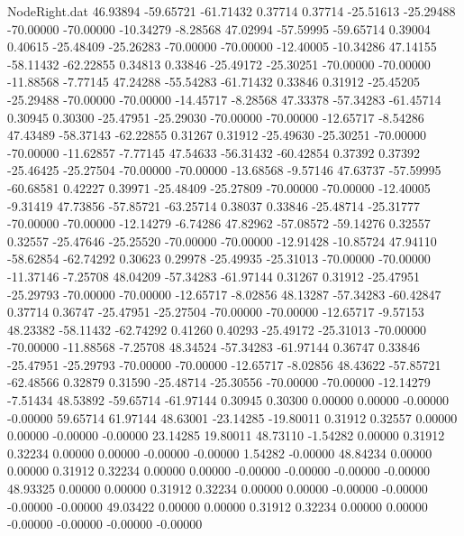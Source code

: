 \begin{filecontents}{NodeRight.dat}
  46.93894  -59.65721  -61.71432     0.37714    0.37714  -25.51613  -25.29488  -70.00000  -70.00000  -10.34279   -8.28568
  47.02994  -57.59995  -59.65714     0.39004    0.40615  -25.48409  -25.26283  -70.00000  -70.00000  -12.40005  -10.34286
  47.14155  -58.11432  -62.22855     0.34813    0.33846  -25.49172  -25.30251  -70.00000  -70.00000  -11.88568   -7.77145
  47.24288  -55.54283  -61.71432     0.33846    0.31912  -25.45205  -25.29488  -70.00000  -70.00000  -14.45717   -8.28568
  47.33378  -57.34283  -61.45714     0.30945    0.30300  -25.47951  -25.29030  -70.00000  -70.00000  -12.65717   -8.54286
  47.43489  -58.37143  -62.22855     0.31267    0.31912  -25.49630  -25.30251  -70.00000  -70.00000  -11.62857   -7.77145
  47.54633  -56.31432  -60.42854     0.37392    0.37392  -25.46425  -25.27504  -70.00000  -70.00000  -13.68568   -9.57146
  47.63737  -57.59995  -60.68581     0.42227    0.39971  -25.48409  -25.27809  -70.00000  -70.00000  -12.40005   -9.31419
  47.73856  -57.85721  -63.25714     0.38037    0.33846  -25.48714  -25.31777  -70.00000  -70.00000  -12.14279   -6.74286
  47.82962  -57.08572  -59.14276     0.32557    0.32557  -25.47646  -25.25520  -70.00000  -70.00000  -12.91428  -10.85724
  47.94110  -58.62854  -62.74292     0.30623    0.29978  -25.49935  -25.31013  -70.00000  -70.00000  -11.37146   -7.25708
  48.04209  -57.34283  -61.97144     0.31267    0.31912  -25.47951  -25.29793  -70.00000  -70.00000  -12.65717   -8.02856
  48.13287  -57.34283  -60.42847     0.37714    0.36747  -25.47951  -25.27504  -70.00000  -70.00000  -12.65717   -9.57153
  48.23382  -58.11432  -62.74292     0.41260    0.40293  -25.49172  -25.31013  -70.00000  -70.00000  -11.88568   -7.25708
  48.34524  -57.34283  -61.97144     0.36747    0.33846  -25.47951  -25.29793  -70.00000  -70.00000  -12.65717   -8.02856
  48.43622  -57.85721  -62.48566     0.32879    0.31590  -25.48714  -25.30556  -70.00000  -70.00000  -12.14279   -7.51434
  48.53892  -59.65714  -61.97144     0.30945    0.30300    0.00000    0.00000   -0.00000   -0.00000   59.65714   61.97144
  48.63001  -23.14285  -19.80011     0.31912    0.32557    0.00000    0.00000   -0.00000   -0.00000   23.14285   19.80011
  48.73110   -1.54282    0.00000     0.31912    0.32234    0.00000    0.00000   -0.00000   -0.00000    1.54282   -0.00000
  48.84234    0.00000    0.00000     0.31912    0.32234    0.00000    0.00000   -0.00000   -0.00000   -0.00000   -0.00000
  48.93325    0.00000    0.00000     0.31912    0.32234    0.00000    0.00000   -0.00000   -0.00000   -0.00000   -0.00000
  49.03422    0.00000    0.00000     0.31912    0.32234    0.00000    0.00000   -0.00000   -0.00000   -0.00000   -0.00000

\end{filecontents}
